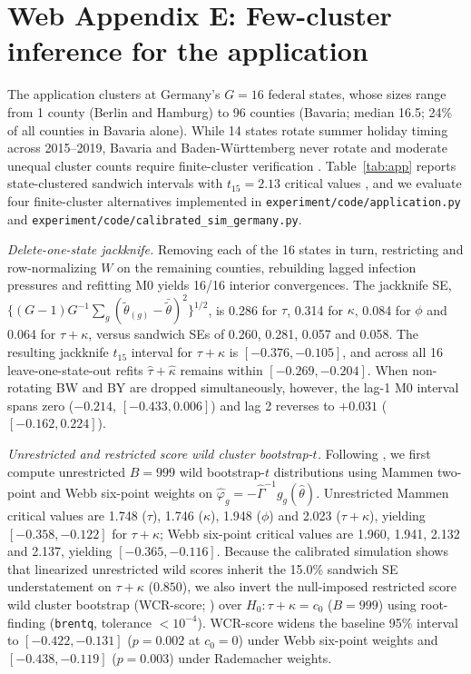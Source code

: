 \section*{Web Appendix E: Few-cluster inference for the application}
\label{app:fewcluster}

The application clusters at Germany's $G=16$ federal states, whose sizes range from 1 county
(Berlin and Hamburg) to 96 counties (Bavaria; median 16.5; 24\% of all counties in Bavaria alone).
While 14 states rotate summer holiday timing across 2015--2019, Bavaria and Baden-W\"urttemberg never
rotate and moderate unequal cluster counts require finite-cluster verification
\citep{mackinnon2017wild,ferman2019inference,canay2021wild}. Table~\ref{tab:app} reports
state-clustered sandwich intervals with $t_{15}=2.13$ critical values \citep{imbens2016robust}, and
we evaluate four finite-cluster alternatives implemented in \texttt{experiment/code/application.py}
and \texttt{experiment/code/calibrated\_sim\_germany.py}.

\emph{Delete-one-state jackknife.} Removing each of the 16 states in turn, restricting and
row-normalizing $W$ on the remaining counties, rebuilding lagged infection pressures and refitting
M0 yields 16/16 interior convergences. The jackknife SE,
$\{(G-1)G^{-1}\sum_g(\tilde\theta_{(g)}-\bar{\tilde\theta})^2\}^{1/2}$, is 0.286 for $\tau$, 0.314
for $\kappa$, 0.084 for $\phi$ and 0.064 for $\tau+\kappa$, versus sandwich SEs of 0.260, 0.281,
0.057 and 0.058. The resulting jackknife $t_{15}$ interval for $\tau+\kappa$ is $[-0.376,-0.105]$,
and across all 16 leave-one-state-out refits $\hat\tau+\hat\kappa$ remains within $[-0.269,-0.204]$.
When non-rotating BW and BY are dropped simultaneously, however, the lag-1 M0 interval spans zero
($-0.214$, $[-0.433,0.006]$) and lag 2 reverses to $+0.031$ ($[-0.162,0.224]$).

\emph{Unrestricted and restricted score wild cluster bootstrap-$t$.} Following \citet{kline2012score},
we first compute unrestricted $B=999$ wild bootstrap-$t$ distributions using Mammen two-point and
Webb six-point weights on $\hat\varphi_g=-\hat\Gamma^{-1}g_g(\hat\theta)$. Unrestricted Mammen
critical values are 1.748 ($\tau$), 1.746 ($\kappa$), 1.948 ($\phi$) and 2.023 ($\tau+\kappa$),
yielding $[-0.358,-0.122]$ for $\tau+\kappa$; Webb six-point critical values are 1.960, 1.941,
2.132 and 2.137, yielding $[-0.365,-0.116]$. Because the calibrated simulation shows that
linearized unrestricted wild scores inherit the 15.0\% sandwich SE understatement on $\tau+\kappa$
($0.850$), we also invert the null-imposed restricted score wild cluster bootstrap
(WCR-score; \citealp{cameron2008bootstrap,kline2012score,webb2023reworking}) over $H_0:\tau+\kappa=c_0$ ($B=999$) using root-finding (\texttt{brentq}, tolerance $<10^{-4}$). WCR-score widens the baseline 95\% interval to
$[-0.422,-0.131]$ ($p=0.002$ at $c_0=0$) under Webb six-point weights and $[-0.438,-0.119]$
($p=0.003$) under Rademacher weights.

